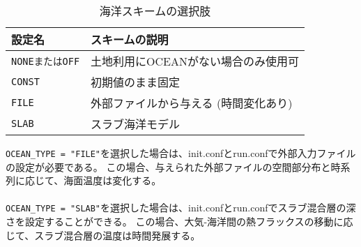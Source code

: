 \begin{table}[h]
\begin{center}
  \caption{海洋スキームの選択肢}
  \label{tab:nml_ocean}
  \begin{tabularx}{150mm}{lX} \hline
    \rowcolor[gray]{0.9}  設定名 & スキームの説明                        \\ \hline
      \verb|NONEまたはOFF|       & 土地利用にOCEANがない場合のみ使用可   \\
      \verb|CONST|               & 初期値のまま固定                      \\
      \verb|FILE|                & 外部ファイルから与える (時間変化あり) \\
      \verb|SLAB|                & スラブ海洋モデル                      \\
    \hline
  \end{tabularx}
\end{center}
\end{table}


\verb|OCEAN_TYPE = "FILE"|を選択した場合は、init.confとrun.confで外部入力ファイルの設定が必要である。
この場合、与えられた外部ファイルの空間部分布と時系列に応じて、海面温度は変化する。\\

\\


\verb|OCEAN_TYPE = "SLAB"|を選択した場合は、init.confとrun.confでスラブ混合層の深さを設定することができる。
この場合、大気-海洋間の熱フラックスの移動に応じて、スラブ混合層の温度は時間発展する。\\

